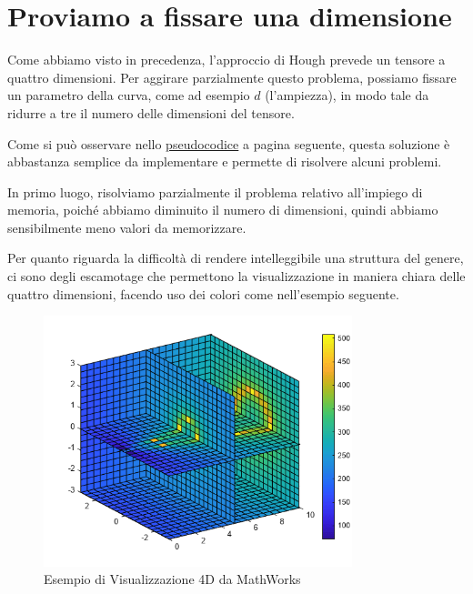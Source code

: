 \section{Proviamo a fissare una dimensione}
Come abbiamo visto in precedenza, l'approccio di Hough prevede un tensore a quattro dimensioni. Per aggirare parzialmente questo problema, possiamo fissare un parametro della curva, come ad esempio $d$ (l'ampiezza), in modo tale da ridurre a tre il numero delle dimensioni del tensore.\par
Come si può osservare nello \hyperref[lst:ostinelli_Tensore3]{pseudocodice} a pagina seguente, questa soluzione è abbastanza semplice da implementare e permette di risolvere alcuni problemi.\par
In primo luogo, risolviamo parzialmente il problema relativo all'impiego di memoria, poiché abbiamo diminuito il numero di dimensioni, quindi abbiamo sensibilmente meno valori da memorizzare.\par
Per quanto riguarda la difficoltà di rendere intelleggibile una struttura del genere, ci sono degli escamotage che permettono la visualizzazione in maniera chiara delle quattro dimensioni, facendo uso dei colori come nell'esempio seguente.

\begin{figure}[h]
    \centering
    \includegraphics[width=0.8\textwidth]{immagini/altro/volume4D.png}
    \caption{Esempio di Visualizzazione 4D da MathWorks \cite{mathworks}}
\end{figure}

\newpage

\newpage

